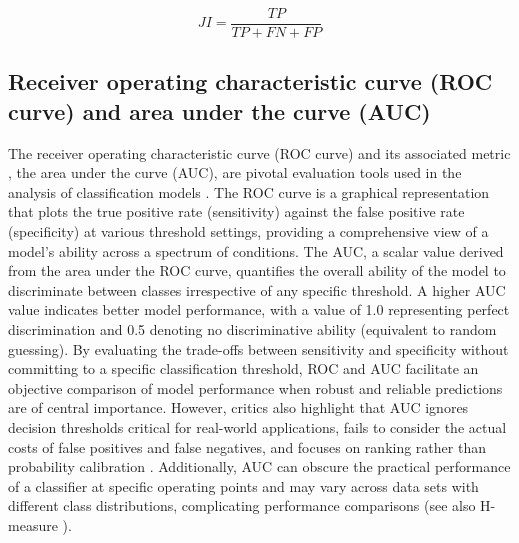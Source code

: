 \documentclass{article}
\begin{document}
\begin{equation}
    \textit{JI} = \dfrac{\textit{TP}}{\textit{TP} + \textit{FN} + \textit{FP}}
%
    \label{equation:JI}
\end{equation}


\subsection[Receiver operating characteristic curve (ROC curve) and area under the curve (AUC)]{Receiver operating characteristic curve (ROC curve) and area under the curve (AUC) \cite{green1966signal, zweig1993receiver, fawcett2006introduction}}

The receiver operating characteristic curve (ROC curve) and its associated metric \cite{green1966signal, zweig1993receiver, fawcett2006introduction}, the area under the curve (AUC), are pivotal evaluation tools used in the analysis of classification models \cite{bradley1997use, mandrekar2010receiver, jimenez2012insights}. The ROC curve is a graphical representation that plots the true positive rate (sensitivity) against the false positive rate (specificity) at various threshold settings, providing a comprehensive view of a model's ability across a spectrum of conditions. The AUC, a scalar value derived from the area under the ROC curve, quantifies the overall ability of the model to discriminate between classes irrespective of any specific threshold. A higher AUC value indicates better model performance, with a value of 1.0 representing perfect discrimination and 0.5 denoting no discriminative ability (equivalent to random guessing). By evaluating the trade-offs between sensitivity and specificity without committing to a specific classification threshold, ROC and AUC facilitate an objective comparison of model performance when robust and reliable predictions are of central importance. However, critics also highlight that AUC ignores decision thresholds critical for real-world applications, fails to consider the actual costs of false positives and false negatives, and focuses on ranking rather than probability calibration \cite{hilden1991area, hand2010evaluating}. Additionally, AUC can obscure the practical performance of a classifier at specific operating points and may vary across data sets with different class distributions, complicating performance comparisons (see also H-measure \cite{hand2009measuring, hand2023notes}).
\end{document}
